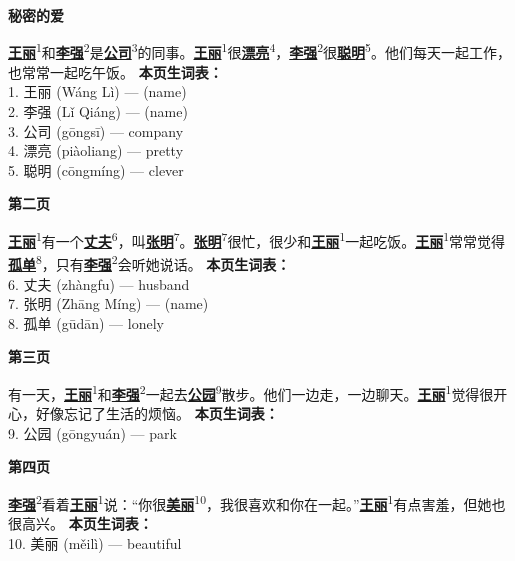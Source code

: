 \documentclass[20pt]{extarticle}
\newcommand{\glossedword}[2]{\uline{\textbf{#1}}\textsuperscript{#2}}
\begin{document}
\begin{center}
    {\fontsize{36}{44}\selectfont \textbf{秘密的爱}}
\end{center}
\vspace{2em}
{\fontsize{22}{30}\selectfont
\noindent
\glossedword{王丽}{1}和\glossedword{李强}{2}是\glossedword{公司}{3}的同事。\glossedword{王丽}{1}很\glossedword{漂亮}{4}，\glossedword{李强}{2}很\glossedword{聪明}{5}。他们每天一起工作，也常常一起吃午饭。
}
\vfill
{\fontsize{18}{26}\selectfont
\noindent
\textbf{本页生词表：}\\[0.5em]
1. 王丽 (Wáng Lì) — (name)\\
2. 李强 (Lǐ Qiáng) — (name)\\
3. 公司 (gōngsī) — company\\
4. 漂亮 (piàoliang) — pretty\\
5. 聪明 (cōngmíng) — clever
}
\newpage

\begin{center}
    {\fontsize{36}{44}\selectfont \textbf{第二页}}
\end{center}
\vspace{2em}
{\fontsize{22}{30}\selectfont
\noindent
\glossedword{王丽}{1}有一个\glossedword{丈夫}{6}，叫\glossedword{张明}{7}。\glossedword{张明}{7}很忙，很少和\glossedword{王丽}{1}一起吃饭。\glossedword{王丽}{1}常常觉得\glossedword{孤单}{8}，只有\glossedword{李强}{2}会听她说话。
}
\vfill
{\fontsize{18}{26}\selectfont
\noindent
\textbf{本页生词表：}\\[0.5em]
6. 丈夫 (zhàngfu) — husband\\
7. 张明 (Zhāng Míng) — (name)\\
8. 孤单 (gūdān) — lonely
}
\newpage

\begin{center}
    {\fontsize{36}{44}\selectfont \textbf{第三页}}
\end{center}
\vspace{2em}
{\fontsize{22}{30}\selectfont
\noindent
有一天，\glossedword{王丽}{1}和\glossedword{李强}{2}一起去\glossedword{公园}{9}散步。他们一边走，一边聊天。\glossedword{王丽}{1}觉得很开心，好像忘记了生活的烦恼。
}
\vfill
{\fontsize{18}{26}\selectfont
\noindent
\textbf{本页生词表：}\\[0.5em]
9. 公园 (gōngyuán) — park
}
\newpage

\begin{center}
    {\fontsize{36}{44}\selectfont \textbf{第四页}}
\end{center}
\vspace{2em}
{\fontsize{22}{30}\selectfont
\noindent
\glossedword{李强}{2}看着\glossedword{王丽}{1}说：“你很\glossedword{美丽}{10}，我很喜欢和你在一起。”\glossedword{王丽}{1}有点害羞，但她也很高兴。
}
\vfill
{\fontsize{18}{26}\selectfont
\noindent
\textbf{本页生词表：}\\[0.5em]
10. 美丽 (měilì) — beautiful
}
\newpage
\end{document}
